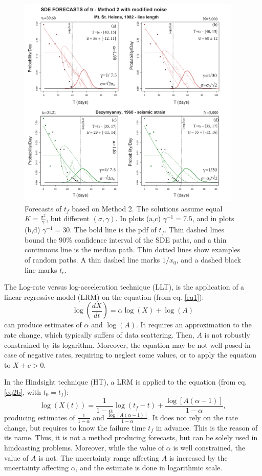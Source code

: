 \documentclass{article}
\begin{document}
\begin{figure}[H]
\centering
\includegraphics[width=0.95\textwidth]{Fig12_plus.png}
\caption{Forecasts of $t_f$ based on Method 2. The solutions assume equal $K=\frac{\sigma^2}{\gamma}$, but different $(\sigma, \gamma)$. In plots (a,c) $\gamma^{-1}=7.5$, and in plots (b,d) $\gamma^{-1}=30$. The bold line is the pdf of $t_f$. Thin dashed lines bound the $90\%$ confidence interval of the SDE paths, and a thin continuous line is the median path. Thin dotted lines show examples of random paths. A thin dashed line marks $1/x_0$, and a dashed black line marks $t_e$.}
\label{Fig12}
\end{figure}

The Log-rate versus log-acceleration technique (LLT), is the application of a linear regressive model (LRM) on the equation (from eq. \ref{eq1}):
$$\log\left(\frac{dX}{dt}\right)=\alpha\log(X)+\log(A)$$
can produce estimates of $\alpha$ and $\log(A)$. It requires an approximation to the rate change, which typically suffers of data scattering. Then, $A$ is not robustly constrained by its logarithm. Moreover, the equation may be not well-posed in case of negative rates, requiring to neglect some values, or to apply the equation to $X+c > 0$.

In the Hindsight technique (HT), a LRM is applied to the equation (from eq. \ref{eq2b}, with $t_0=t_f$):
$$\log(X(t))=\frac{1}{1-\alpha}\log(t_f-t)+\frac{\log[A(\alpha-1)]}{1-\alpha},$$
producing estimates of $\frac{1}{1-\alpha}$ and $\frac{\log[A(\alpha-1)]}{1-\alpha}$. It does not rely on the rate change, but requires to know the failure time $t_f$ in advance. This is the reason of its name. Thus, it is not a method producing forecasts, but can be solely used in hindcasting problems. Moreover, while the value of $\alpha$ is well constrained, the value of $A$ is not. The uncertainty range affecting $A$ is increased by the uncertainty affecting $\alpha$, and the estimate is done in logarithmic scale.
\end{document}
